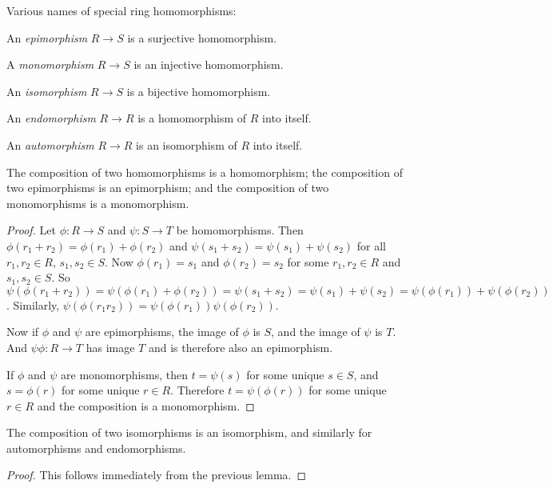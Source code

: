 \begin{Def}
  Various names of special ring homomorphisms:

  An \emph{epimorphism} $R \to S$ is a surjective homomorphism.

  A \emph{monomorphism} $R \to S$ is an injective homomorphism.

  An \emph{isomorphism} $R \to S$ is a bijective homomorphism.

  An \emph{endomorphism} $R \to R$ is a homomorphism of $R$ into itself.

  An \emph{automorphism} $R \to R$ is an isomorphism of $R$ into itself.
\end{Def}

\begin{Lemma}
The composition of two homomorphisms is a homomorphism; the composition
of two epimorphisms is an epimorphism; and the composition of two
monomorphisms is a monomorphism.
\end{Lemma}

\begin{proof}
  Let $\phi : R \to S$ and $\psi : S \to T$ be homomorphisms. Then $\phi(r_1 +
  r_2) = \phi(r_1) + \phi(r_2)$ and $\psi(s_1 + s_2) = \psi(s_1) + \psi(s_2)$
  for all $r_1, r_2 \in R$, $s_1, s_2 \in S$.  Now $\phi(r_1) = s_1$ and
  $\phi(r_2) = s_2$ for some $r_1, r_2 \in R$ and $s_1, s_2 \in S$. So
  $\psi(\phi(r_1 + r_2)) = \psi(\phi(r_1) + \phi(r_2)) = \psi(s_1 + s_2) =
  \psi(s_1) + \psi(s_2) = \psi(\phi(r_1)) + \psi(\phi(r_2))$.  Similarly,
  $\psi(\phi(r_1 r_2)) = \psi(\phi(r_1)) \psi(\phi(r_2))$.

  Now if $\phi$ and $\psi$ are epimorphisms, the image of $\phi$ is $S$, and
  the image of $\psi$ is $T$. And $\psi \phi : R \to T$ has image $T$ and is
  therefore also an epimorphism.

  If $\phi$ and $\psi$ are monomorphisms, then $t = \psi(s)$ for some unique $s
  \in S$, and $s = \phi(r)$ for some unique $r \in R$. Therefore $t = \psi (
  \phi (r) )$ for some unique $r \in R$ and the composition is a monomorphism.
\end{proof}

\begin{Cor}
  The composition of two isomorphisms is an isomorphism, and similarly for
  automorphisms and endomorphisms.
\end{Cor}

\begin{proof}
  This follows immediately from the previous lemma.
\end{proof}

